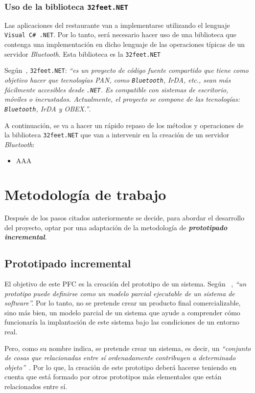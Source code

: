   \subsubsection{Uso de la biblioteca \texttt{32feet.NET}}
Las aplicaciones del restaurante van a implementarse utilizando el lenguaje
\texttt{Visual C\# .NET}. Por lo tanto, será necesario hacer uso de una 
biblioteca que contenga una implementación en dicho lenguaje de las 
operaciones típicas de un servidor \emph{Bluetooth}. Esta biblioteca es la
\texttt{32feet.NET}

Según~\cite{bib:32feet}, \texttt{32feet.NET}: \emph{``es un proyecto de código 
fuente compartido que tiene como objetivo hacer que tecnologías \acs{PAN}, como 
\texttt{Bluetooth}, \acs{IrDA}, etc., sean más fácilmente accesibles desde 
\texttt{.NET}. Es compatible con sistemas de escritorio, móviles o incrustados.
Actualmente, el proyecto se compone de las tecnologías: \texttt{Bluetooth},
\acs{IrDA} y \acs{OBEX}.''}.

A continuación, se va a hacer un rápido repaso de los métodos y operaciones
de la biblioteca \texttt{32feet.NET} que van a intervenir en la creación de un 
servidor \emph{Bluetooth}:
\begin{itemize}
\item AAA
\end{itemize}

\section{Metodología de trabajo}
\label{sec:workingMethodology}
Después de los pasos citados anteriormente se decide, para abordar el
desarrollo del proyecto, optar por una adaptación de la metodología de 
\emph{\textbf{prototipado incremental}}.

  \subsection{Prototipado incremental}
El objetivo de este \acs{PFC} es la creación del prototipo de un sistema.
Según ~\cite{bib:software_engineering}, \emph{``un prototipo puede definirse
como  un modelo parcial ejecutable de un sistema de software''.} Por lo tanto, 
no se pretende crear un producto final comercializable, sino más bien, un
modelo parcial de un sistema que ayude a comprender cómo funcionaría la
implantación de este sistema bajo las condiciones de un entorno real.

Pero, como su nombre indica, se pretende crear un sistema, es decir, un
\emph{``conjunto de cosas que relacionadas entre sí ordenadamente contribuyen 
a determinado objeto''}~\cite{bib:rae}. Por lo que, la creación de este 
prototipo deberá hacerse teniendo en cuenta que está formado por otros 
prototipos más elementales que están relacionados entre sí.

